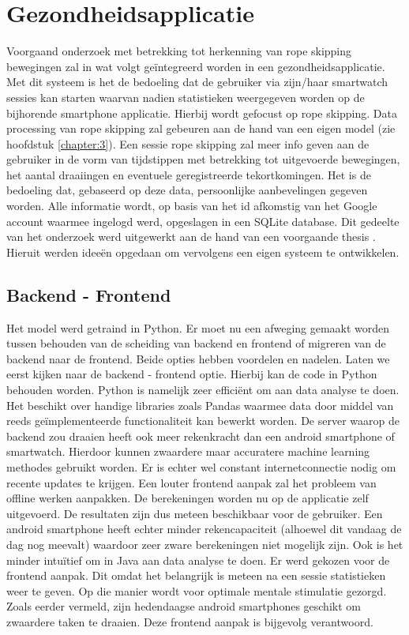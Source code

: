 \chapter{Gezondheidsapplicatie}
Voorgaand onderzoek met betrekking tot herkenning van rope skipping bewegingen zal in wat volgt geïntegreerd worden in een gezondheidsapplicatie.
Met dit systeem is het de bedoeling dat de gebruiker via zijn/haar smartwatch sessies kan starten waarvan nadien statistieken weergegeven worden op de bijhorende smartphone applicatie. Hierbij wordt gefocust op rope skipping. Data processing van rope skipping zal gebeuren aan de hand van een eigen model (zie hoofdstuk \ref{chapter:3}). Een sessie rope skipping zal meer info geven aan de gebruiker in de vorm van tijdstippen met betrekking tot uitgevoerde bewegingen, het aantal draaiingen en eventuele geregistreerde tekortkomingen. Het is de bedoeling dat, gebaseerd op deze data, persoonlijke aanbevelingen gegeven worden. Alle informatie wordt, op basis van het id afkomstig van het Google account waarmee ingelogd werd, opgeslagen in een SQLite database. Dit gedeelte van het onderzoek werd uitgewerkt aan de hand van een voorgaande thesis \cite{ref73}. Hieruit werden ideeën opgedaan om vervolgens een eigen systeem te ontwikkelen.

\section{Backend - Frontend}
Het model werd getraind in Python. Er moet nu een afweging gemaakt worden tussen behouden van de scheiding van backend en frontend of migreren van de backend naar de frontend. Beide opties hebben voordelen en nadelen. Laten we eerst kijken naar de backend - frontend optie. Hierbij kan de code in Python behouden worden. Python is namelijk zeer efficiënt om aan data analyse te doen. Het beschikt over handige libraries zoals Pandas waarmee data door middel van reeds geïmplementeerde functionaliteit kan bewerkt worden. De server waarop de backend zou draaien heeft ook meer rekenkracht dan een android smartphone of smartwatch. Hierdoor kunnen zwaardere maar accuratere machine learning methodes gebruikt worden. Er is echter wel constant internetconnectie nodig om recente updates te krijgen.
Een louter frontend aanpak zal het probleem van offline werken aanpakken. De berekeningen worden nu op de applicatie zelf uitgevoerd. De resultaten zijn dus meteen beschikbaar voor de gebruiker. Een android smartphone heeft echter minder rekencapaciteit (alhoewel dit vandaag de dag nog meevalt) waardoor zeer zware berekeningen niet mogelijk zijn. Ook is het minder intuïtief om in Java aan data analyse te doen. 
Er werd gekozen voor de frontend aanpak. Dit omdat het belangrijk is meteen na een sessie statistieken weer te geven. Op die manier wordt voor optimale mentale stimulatie gezorgd. Zoals eerder vermeld, zijn hedendaagse android smartphones geschikt om zwaardere taken te draaien. Deze frontend aanpak is bijgevolg verantwoord. 

